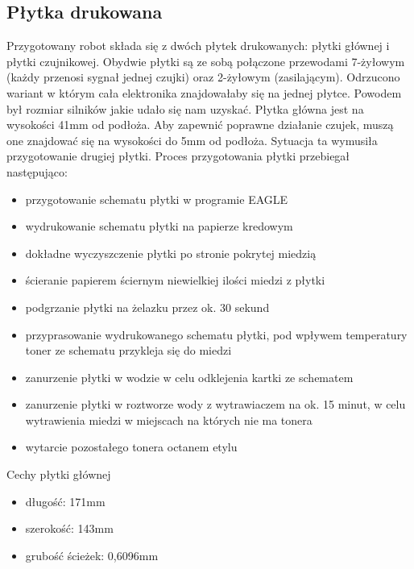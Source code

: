 \documentclass[11pt,a4paper]{article}
\begin{document}
\subsection{Płytka drukowana} 
Przygotowany robot składa się z dwóch płytek drukowanych: płytki głównej i płytki czujnikowej. 
Obydwie płytki są ze sobą połączone przewodami 7-żyłowym (każdy przenosi sygnał jednej czujki) oraz 2-żyłowym (zasilającym).
Odrzucono wariant w którym cała elektronika znajdowałaby się na jednej płytce. Powodem był rozmiar silników jakie udało się nam uzyskać. 
Płytka główna jest na wysokości 41mm od podłoża. Aby zapewnić poprawne działanie czujek, muszą one znajdować się na wysokości do 5mm od podłoża. 
Sytuacja ta wymusiła przygotowanie drugiej płytki. Proces przygotowania płytki przebiegał następująco:
  \begin {itemize}
    \item przygotowanie schematu płytki w programie EAGLE
    \item wydrukowanie schematu płytki na papierze kredowym
    \item dokładne wyczyszczenie płytki po stronie pokrytej miedzią
    \item ścieranie papierem ściernym niewielkiej ilości miedzi z płytki
    \item podgrzanie płytki na żelazku przez ok. 30 sekund
    \item przyprasowanie wydrukowanego schematu płytki, pod wpływem temperatury toner ze schematu przykleja się do miedzi
    \item zanurzenie płytki w wodzie w celu odklejenia kartki ze schematem
    \item zanurzenie płytki w roztworze wody z wytrawiaczem na ok. 15 minut, w celu wytrawienia miedzi w miejscach na których nie ma tonera
    \item wytarcie pozostałego tonera octanem etylu
  \end{itemize}
Cechy płytki głównej
  \begin{itemize}
    \item długość: 171mm
    \item szerokość: 143mm
    \item grubość ścieżek: 0,6096mm
  \end{itemize}
\end{document}
